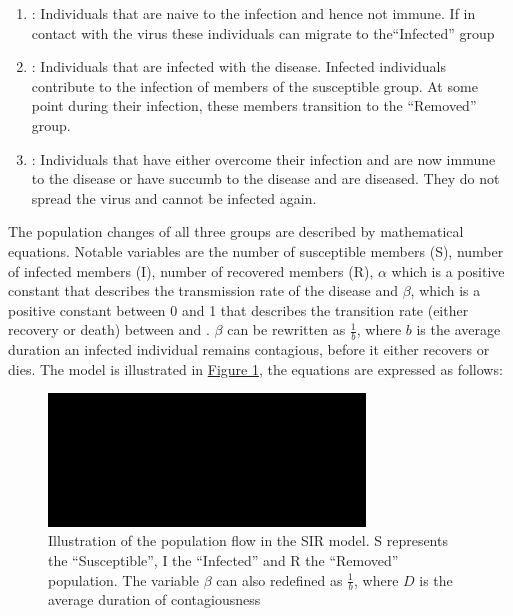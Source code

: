 \begin{enumerate}[label=$\bullet$]
	\item {}: Individuals that are naive to the infection and hence not immune. If in contact with
		the virus these individuals can migrate to the\linebreak ``Infected'' group
	\item {}: Individuals that are infected with the disease. Infected individuals contribute to the 
		infection of members of the susceptible group. At some point during their infection, these members
		transition to the ``Removed'' group.
	\item {}: Individuals that  have either overcome their infection and are now immune to the disease
		or have succumb to the disease and are diseased. They do not spread the virus and cannot be infected again.
\end{enumerate}

\par
The population changes of all three groups are described by mathematical equations\cite{mathSIR}. Notable variables
are the number of susceptible members (S), number of infected members (I), number of recovered members (R), $\alpha$
which is a positive constant that describes the transmission rate of the disease and $\beta$, which is a positive
constant between 0 and 1 that describes the transition rate (either recovery or death) between  and .
$\beta$ can be rewritten as $\frac{1}{b}$, where $b$ is the average duration an infected individual remains contagious,
before it either recovers or dies. The model is illustrated in \hyperref[fig:SIR]{Figure \ref*{fig:SIR}}, the equations
are expressed as follows:

\begin{figure}
	\begin{center}
		\includegraphics[width=0.75\textwidth]{./figures/SIR.png}
		\caption{Illustration of the population flow in the SIR model. S represents the ``Susceptible'', I
			the ``Infected'' and R the ``Removed'' population. The variable $\beta$ can also redefined
			as $\frac{1}{b}$, where $D$ is the average duration of contagiousness}
		\label{fig:SIR}
	\end{center}
\end{figure}


